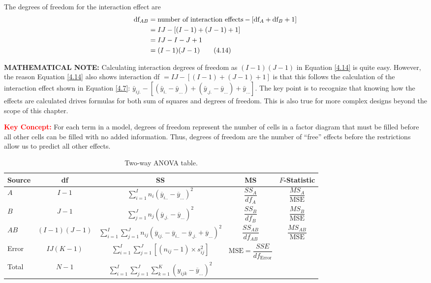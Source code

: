 \documentclass[
]{report}
\begin{document}
The degrees of freedom for the interaction effect are
\begin{align}\label{4.14}
\text{df}_{AB} &= \text{number of interaction effects} - [\text{df}_A + \text{df}_B + 1] \notag \\
&= IJ - [(I-1) + (J-1) + 1] \notag \\
&= IJ - I - J + 1 \notag \\
&= (I-1)(J-1)
\tag{4.14}
\end{align}

\large

\textbf{MATHEMATICAL NOTE:}
Calculating interaction degrees of freedom as \((I-1)(J-1)\) in Equation \ref{4.14} is quite easy. However, the reason Equation \ref{4.14} also shows interaction df \(= IJ - [(I-1) + (J-1) + 1]\) is that this follows the calculation of the interaction effect shown in Equation \ref{4.7}: \(\bar{y}_{ij.} - [(\bar{y}_{i.} - \bar{y}_{...}) + (\bar{y}_{.j.} - \bar{y}_{...}) + \bar{y}_{...}]\). The key point is to recognize that knowing how the effects are calculated drives formulas for both sum of squares and degrees of freedom. This is also true for more complex designs beyond the scope of this chapter.
\normalsize

\large

\textbf{\textcolor{red}{Key Concept:}}
\color{red}
For each term in a model, degrees of freedom represent the number of cells in a factor diagram that must be filled before all other cells can be filled with no added information. Thus, degrees of freedom are the number of ``free'' effects before the restrictions allow us to predict all other effects.
\color{black}
\normalsize

\begin{table}[!h]
\centering
\caption{\label{tab:tab48}Two-way ANOVA table.}
\centering
\begin{tabular}[t]{lcccc}
\toprule
Source & df & SS & MS & $F$-Statistic\\
\midrule
$A$ & $I - 1$ & $\displaystyle\sum_{i=1}^{I} n_i (\overline{y}_{i..} - \overline{y}_{...})^2$ & $\dfrac{SS_A}{df_A}$ & $\dfrac{MS_A}{\text{MSE}}$\\
$B$ & $J - 1$ & $\displaystyle\sum_{j=1}^{J} n_j (\overline{y}_{.j.} - \overline{y}_{...})^2$ & $\dfrac{SS_B}{df_B}$ & $\dfrac{MS_B}{\text{MSE}}$\\
$AB$ & $(I-1)(J-1)$ & $\displaystyle\sum_{i=1}^{I}\sum_{j=1}^{J} n_{ij}(\overline{y}_{ij.} - \overline{y}_{i..} - \overline{y}_{.j.} + \overline{y}_{...})^2$ & $\dfrac{SS_{AB}}{df_{AB}}$ & $\dfrac{MS_{AB}}{\text{MSE}}$\\
Error & $IJ(K-1)$ & $\displaystyle\sum_{i=1}^I\sum_{j=1}^J [(n_{ij} - 1) \times s^2_{ij}]$ & $\text{MSE} = \dfrac{SSE}{df_{\text{Error}}}$ & \\
Total & $N-1$ & $\displaystyle\sum_{i=1}^I\sum_{j=1}^J\sum_{k=1}^K (y_{ijk} - \overline{y}_{...})^2$ &  & \\
\bottomrule
\end{tabular}
\end{table}
\end{document}
